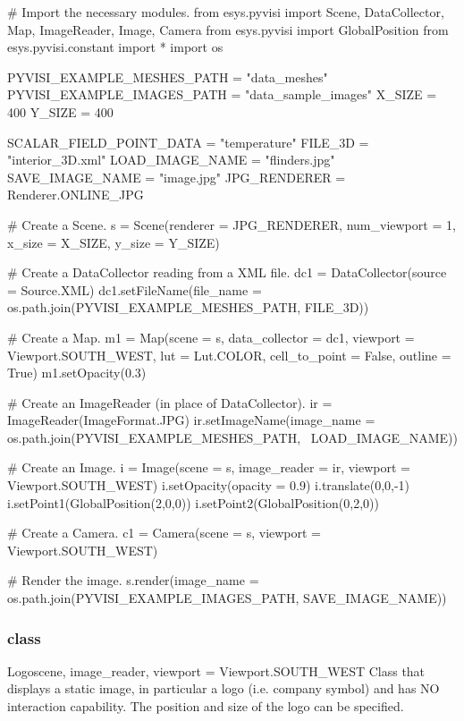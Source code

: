 \begin{python}
# Import the necessary modules.
from esys.pyvisi import Scene, DataCollector, Map, ImageReader, Image, Camera
from esys.pyvisi import GlobalPosition
from esys.pyvisi.constant import *
import os

PYVISI_EXAMPLE_MESHES_PATH = "data_meshes"
PYVISI_EXAMPLE_IMAGES_PATH = "data_sample_images"
X_SIZE = 400
Y_SIZE = 400

SCALAR_FIELD_POINT_DATA = "temperature"
FILE_3D = "interior_3D.xml"
LOAD_IMAGE_NAME = "flinders.jpg"
SAVE_IMAGE_NAME = "image.jpg"
JPG_RENDERER = Renderer.ONLINE_JPG

# Create a Scene.
s = Scene(renderer = JPG_RENDERER, num_viewport = 1, x_size = X_SIZE, 
        y_size = Y_SIZE)

# Create a DataCollector reading from a XML file.
dc1 = DataCollector(source = Source.XML)
dc1.setFileName(file_name = os.path.join(PYVISI_EXAMPLE_MESHES_PATH, FILE_3D))

# Create a Map.
m1 = Map(scene = s, data_collector = dc1, viewport = Viewport.SOUTH_WEST,
        lut = Lut.COLOR, cell_to_point = False, outline = True)
m1.setOpacity(0.3)

# Create an ImageReader (in place of DataCollector).
ir = ImageReader(ImageFormat.JPG)
ir.setImageName(image_name =  os.path.join(PYVISI_EXAMPLE_MESHES_PATH, \
        LOAD_IMAGE_NAME))

# Create an Image.
i = Image(scene = s, image_reader = ir, viewport = Viewport.SOUTH_WEST)
i.setOpacity(opacity = 0.9)
i.translate(0,0,-1)
i.setPoint1(GlobalPosition(2,0,0))
i.setPoint2(GlobalPosition(0,2,0))

# Create a Camera. 
c1 = Camera(scene = s, viewport = Viewport.SOUTH_WEST)

# Render the image.
s.render(image_name = os.path.join(PYVISI_EXAMPLE_IMAGES_PATH, SAVE_IMAGE_NAME))
\end{python}

\subsubsection{\Logo class}

\begin{classdesc}{Logo}{scene, image_reader, viewport = Viewport.SOUTH_WEST}
Class that displays a static image, in particular a logo
(i.e. company symbol) and has NO interaction capability. The position and size
of the logo can be specified.
\end{classdesc}

